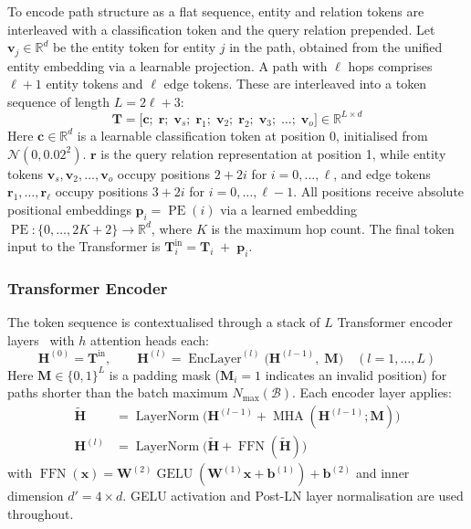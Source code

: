 \documentclass[runningheads]{llncs}
\begin{document}
To encode path structure as a flat sequence, entity and relation tokens are interleaved
with a classification token and the query relation prepended.
Let $\mathbf{v}_j \in \mathbb{R}^{d}$ be the entity token for entity $j$ in the path,
obtained from the unified entity embedding via a learnable projection.
A path with $\ell$ hops comprises $\ell+1$ entity tokens and $\ell$ edge tokens.
These are interleaved into a token sequence of length $L = 2\ell + 3$:
\begin{equation}
  \mathbf{T} = \bigl[\mathbf{c};\; \mathbf{r};\;
    \mathbf{v}_{s};\; \mathbf{r}_{1};\; \mathbf{v}_{2};\; \mathbf{r}_{2};\;
  \mathbf{v}_{3};\; \ldots;\; \mathbf{v}_{o}\bigr]
  \in \mathbb{R}^{L \times d}
  \label{eq:token-seq}
\end{equation}
Here $\mathbf{c} \in \mathbb{R}^{d}$ is a learnable classification token
at position 0, initialised from $\mathcal{N}(0, 0.02^2)$.
$\mathbf{r}$ is the query relation representation at position 1, while entity tokens
$\mathbf{v}_{s}, \mathbf{v}_{2}, \ldots, \mathbf{v}_{o}$ occupy positions $2 + 2i$
for $i = 0, \ldots, \ell$, and edge tokens $\mathbf{r}_{1}, \ldots, \mathbf{r}_{\ell}$
occupy positions $3 + 2i$ for $i = 0, \ldots, \ell - 1$.
All positions receive absolute positional embeddings
$\mathbf{p}_i = \operatorname{PE}(i)$ via a learned embedding
$\operatorname{PE}: \{0, \ldots, 2K+2\} \to \mathbb{R}^{d}$,
where $K$ is the maximum hop count.
The final token input to the Transformer is $\mathbf{T}^{\text{in}}_i = \mathbf{T}_i \;+\; \mathbf{p}_i$.
\subsubsection{Transformer Encoder}

\label{sec:transformer-encoder}

The token sequence is contextualised through a stack of $L$
Transformer encoder layers~\cite{vaswani2017attention} with $h$ attention heads each:
\begin{equation}
  \mathbf{H}^{(0)} = \mathbf{T}^{\text{in}},\qquad
  \mathbf{H}^{(l)} = \operatorname{EncLayer}^{(l)}\bigl(\mathbf{H}^{(l-1)},\; \mathbf{M}\bigr)
  \quad (l = 1, \ldots, L)
  \label{eq:transformer}
\end{equation}
Here $\mathbf{M} \in \{0, 1\}^{L}$ is a padding mask ($\mathbf{M}_i = 1$ indicates an
invalid position) for paths shorter than the batch maximum $N_{\max}(\mathcal{B})$.
Each encoder layer applies:
\begin{align}
  \tilde{\mathbf{H}} &= \operatorname{LayerNorm}\bigl(
  \mathbf{H}^{(l-1)} + \operatorname{MHA}(\mathbf{H}^{(l-1)}; \mathbf{M})\bigr)
  \label{eq:attn}\\
  \mathbf{H}^{(l)} &= \operatorname{LayerNorm}\bigl(
  \tilde{\mathbf{H}} + \operatorname{FFN}(\tilde{\mathbf{H}})\bigr)
  \label{eq:ffn}
\end{align}
with $\operatorname{FFN}(\mathbf{x}) = \mathbf{W}^{(2)} \operatorname{GELU}(\mathbf{W}^{(1)} \mathbf{x} + \mathbf{b}^{(1)}) + \mathbf{b}^{(2)}$
and inner dimension $d' = 4 \times d$.
GELU \cite{hendrycks2016gaussian} activation
and Post-LN layer normalisation are used throughout.
\end{document}
